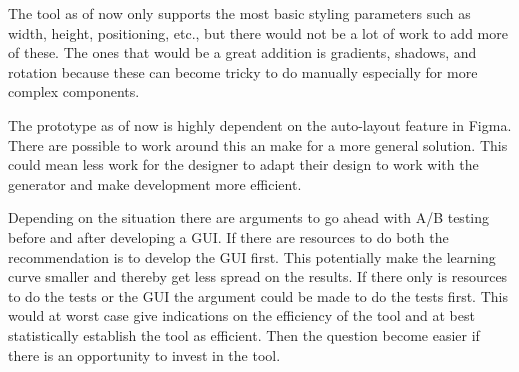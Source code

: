 The tool as of now only supports the most basic styling parameters such as width, height, positioning, etc., but there would not be a lot of work to add more of these. The ones that would be a great addition is gradients, shadows, and rotation because these can become tricky to do manually especially for more complex components. 

The prototype as of now is highly dependent on the auto-layout feature in Figma. There are possible to work around this an make for a more general solution. This could mean less work for the designer to adapt their design to work with the generator and make development more efficient. 

Depending on the situation there are arguments to go ahead with A/B testing before and after developing a GUI. If there are resources to do both the recommendation is to develop the GUI first. This potentially make the learning curve smaller and thereby get less spread on the results. If there only is resources to do the tests or the GUI the argument could be made to do the tests first. This would at worst case give indications on the efficiency of the tool and at best statistically establish the tool as efficient. Then the question become easier if there is an opportunity to invest in the tool.

